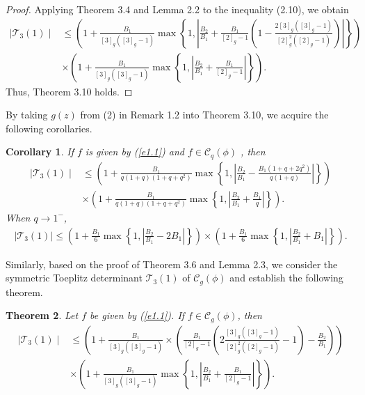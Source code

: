 \documentclass[11pt,twoside, reqno]{article}
\newtheorem{theorem}{Theorem}[section]
\newtheorem{corollary}[theorem]{Corollary}
\theoremstyle{definition}
\begin{document}
\begin{proof}

Applying Theorem 3.4 and Lemma 2.2 to the inequality (2.10), we obtain
\begin{align}\nonumber
\mid \mathcal{T}_3(1)\mid &\leq \left(1+\frac{B_{1}}{[3]_{g}([3]_{g}-1)}\max\left\{1,\left|\frac{B_{2}}{B_{1}}+
\frac{B_{1}}{[2]_{g}-1}\left(1-\frac{2[3]_{g}([3]_{g}-1)}{[2]_{g}^{2}([2]_{g}-1)}\right)\right|\right\}\right)\\\nonumber
&\times\left(1+\frac{B_{1}}{[3]_{g}([3]_{g}-1)}\max\left\{1, \left|\frac{B_{2}}{B_{1}}+\frac{B_{1}}{[2]_{g}-1}\right|\right\}\right).
\end{align}
Thus, Theorem 3.10 holds.
\end{proof}
By taking  $g(z)$ from (2) in Remark 1.2 into Theorem 3.10, we acquire the following corollaries.
\begin{corollary}
If $f$ is given by (\ref{e1.1}) and $f\in\mathcal{C}_{q}(\phi)$ , then
\begin{align}\nonumber
\mid \mathcal{T}_3(1)\mid &\leq \left(1+\frac{B_{1}}{q(1+q)(1+q+q^{2})}\max\left\{1,\left|\frac{B_{2}}{B_{1}}-
\frac{B_{1}(1+q+2q^{2})}{q(1+q)}\right|\right\}\right)\\\nonumber
&\times\left(1+\frac{B_{1}}{q(1+q)(1+q+q^{2})}\max\left\{1, \left|\frac{B_{2}}{B_{1}}+\frac{B_{1}}{q}\right|\right\}\right).
\end{align}
When $q\rightarrow1^{-}$,
\begin{align}\nonumber
\mid \mathcal{T}_3(1)\mid \leq \left(1+\frac{B_{1}}{6}\max\left\{1,\left|\frac{B_{2}}{B_{1}}-
2B_{1}\right|\right\}\right)\times\left(1+\frac{B_{1}}{6}\max\left\{1, \left|\frac{B_{2}}{B_{1}}+B_{1}\right|\right\}\right).
\end{align}
\end{corollary}
Similarly, based on the proof of Theorem 3.6 and Lemma 2.3, we consider the symmetric Toeplitz determinant $\mathcal{T}_3(1)$ of $\mathcal{C}_{g}(\phi)$ and establish the following theorem.
\begin{theorem}
Let $f$ be given by (\ref{e1.1}). If $f\in\mathcal{C}_{g}(\phi)$, then
\begin{align}\nonumber
\mid \mathcal{T}_3(1)\mid &\leq \left(1+\frac{B_{1}}{[3]_{g}([3]_{g}-1)}\times\left(\frac{B_{1}}{[2]_{g}-1}\left(2\frac{[3]_{g}([3]_{g}-1)}{[2]_{g}^{2}([2]_{g}-1)}-1\right)-\frac{B_{2}}{B_{1}}\right)\right)\\\nonumber
&\times\left(1+\frac{B_{1}}{[3]_{g}([3]_{g}-1)}\max\left\{1, \left|\frac{B_{2}}{B_{1}}+\frac{B_{1}}{[2]_{g}-1}\right|\right\}\right).
\end{align}
\end{theorem}
\end{document}
